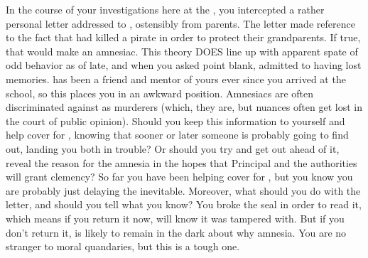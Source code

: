 \documentclass[char]{GL2020}
\begin{document}
In the course of your investigations here at the \pSc{}, you intercepted a rather personal letter addressed to \cLibrarian{\full}, ostensibly from \cLibrarian{\their} parents. The letter made reference to the fact that \cLibrarian{} had killed a pirate in order to protect their grandparents. If true, that would make \cLibrarian{} an amnesiac. This theory DOES line up with \cLibrarian{\their} apparent spate of odd behavior as of late, and when you asked \cLibrarian{\them} point blank, \cLibrarian{\they} admitted to having lost \cLibrarian{\their} memories. \cLibrarian{} has been a friend and mentor of yours ever since you arrived at the school, so this places you in an awkward position. Amnesiacs are often discriminated against as murderers (which, they are, but nuances often get lost in the court of public opinion). Should you keep this information to yourself and help cover for \cLibrarian{\them}, knowing that sooner or later someone is probably going to find out, landing you both in trouble? Or should you try and get out ahead of it, reveal the reason for the amnesia in the hopes that Principal \cPrincipal{\full} and the authorities will grant clemency? So far you have been helping cover for \cLibrarian{\them}, but you know you are probably just delaying the inevitable. Moreover, what should you do with the letter, and should you tell \cLibrarian{} what you know? You broke the seal in order to read it, which means if you return it now, \cLibrarian{} will know it was tampered with. But if you don't return it, \cLibrarian{\they} is likely to remain in the dark about why \cLibrarian{\they} \cLibrarian{\have} amnesia. You are no stranger to moral quandaries, but this is a tough one.
\end{document}

